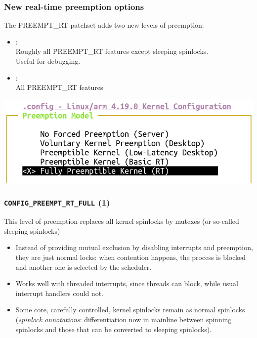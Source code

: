 \begin{frame}
  \frametitle{New real-time preemption options}
  The PREEMPT\_RT patchset adds two new levels of preemption:
  \begin{itemize}
    \item {}:\\
    Roughly all PREEMPT\_RT features except sleeping spinlocks.\\
    Useful for debugging.
    \item {}:\\
    All PREEMPT\_RT features
  \end{itemize}
  \begin{center}
    \includegraphics[height=0.4\textheight]{slides/sysdev-realtime/rt-preempt-options.png}
  \end{center}
  
\end{frame}

\begin{frame}
  \frametitle{{\tt CONFIG\_PREEMPT\_RT\_FULL} (1)}
  This level of preemption replaces all kernel spinlocks by
  mutexes (or so-called sleeping spinlocks)
  \begin{itemize}
  \item Instead of providing mutual exclusion by disabling
    interrupts and preemption, they are just normal locks: when
    contention happens, the process is blocked and another one is
    selected by the scheduler.
  \item Works well with threaded interrupts, since threads can
    block, while usual interrupt handlers could not.
  \item Some core, carefully controlled, kernel spinlocks remain as
    normal spinlocks ({\em spinlock annotations}: differentiation
    now in mainline between spinning spinlocks and those that can be
    converted to sleeping spinlocks).
  \end{itemize}
\end{frame}


